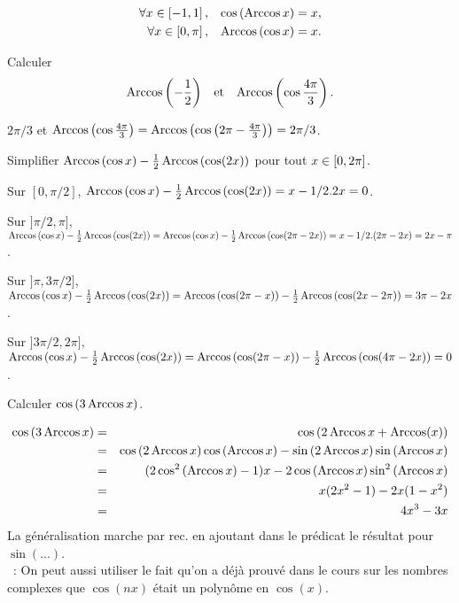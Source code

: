 \documentclass{magnolia}
\begin{document}
\begin{proposition}[utile=-3]
\begin{eqnarray*}
\forall x\in\left[-1,1\right],& & \cos\left(\operatorname{Arccos} x\right)=x,\\
\forall x\in\left[0,\pi\right],& & \operatorname{Arccos}\left(\cos x\right)=x .   
\end{eqnarray*}
\end{proposition}

\begin{exos}
\exemple Calculer
  \[\operatorname{Arccos}\left(-\frac{1}{2}\right) \quad\!\text{et}\quad\! \operatorname{Arccos}\left(\cos\frac{4\pi}{3}\right).\]
  \begin{sol}
  $2\pi/3$ et $\operatorname{Arccos}\left(\cos\frac{4\pi}{3}\right)=\operatorname{Arccos}\left(\cos\left(2\pi-\frac{4\pi}{3}\right)\right)=2\pi/3$.
  \end{sol}
\exemple Simplifier $\operatorname{Arccos}\left(\cos x\right)-\frac{1}{2}\operatorname{Arccos}\left(\cos(2x)\right)$
  pour tout $x\in\left[0,2\pi\right]$.
  \begin{sol}
  Sur $[0,\pi/2]$, $\operatorname{Arccos}\left(\cos x\right)-\frac{1}{2}\operatorname{Arccos}\left(\cos(2x)\right)=x-1/2.2x=0$.
  
  Sur $]\pi/2,\pi]$, $\operatorname{Arccos}\left(\cos x\right)-\frac{1}{2}\operatorname{Arccos}\left(\cos(2x)\right)=\operatorname{Arccos}\left(\cos x\right)-\frac{1}{2}\operatorname{Arccos}\left(\cos(2\pi-2x)\right)=x-1/2.(2\pi-2x)=2x-\pi$.
  
  Sur $]\pi,3\pi/2]$, $\operatorname{Arccos}\left(\cos x\right)-\frac{1}{2}\operatorname{Arccos}\left(\cos(2x)\right)=\operatorname{Arccos}\left(\cos(2\pi- x)\right)-\frac{1}{2}\operatorname{Arccos}\left(\cos(2x-2\pi)\right)=3\pi-2x$.
  
  Sur $]3\pi/2,2\pi]$, $\operatorname{Arccos}\left(\cos x\right)-\frac{1}{2}\operatorname{Arccos}\left(\cos(2x)\right)=\operatorname{Arccos}\left(\cos (2\pi-x)\right)-\frac{1}{2}\operatorname{Arccos}\left(\cos(4\pi-2x)\right)=0$.
  
  \end{sol}
\exemple Calculer $\cos\left(3\operatorname{Arccos} x\right)$.
  \begin{sol}
  \begin{eqnarray*}
  \cos\left(3\operatorname{Arccos} x\right)&=&\cos\left(2\operatorname{Arccos} x+\operatorname{Arccos}(x)\right)\\
  &=&\cos\left(2\operatorname{Arccos} x\right)\cos\left(\operatorname{Arccos} x\right)-\sin\left(2\operatorname{Arccos} x\right)\sin\left(\operatorname{Arccos} x\right)\\
  &=&(2\cos^2\left(\operatorname{Arccos} x\right)-1)x-2\cos\left(\operatorname{Arccos} x\right)\sin^2\left(\operatorname{Arccos} x\right)\\
  &=&x(2x^2-1)-2x(1-x^2)\\
  &=&4x^3-3x
  \end{eqnarray*}
  La généralisation marche par rec. en ajoutant dans le prédicat le résultat pour $\sin(...)$.\\
  ~: On peut aussi utiliser le fait qu'on a déjà prouvé dans le cours sur les nombres complexes que $\cos(nx)$ était un polynôme en $\cos(x)$.
  \end{sol}
\end{exos}
\end{document}
